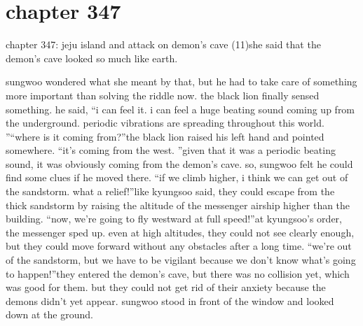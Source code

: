 \section{chapter 347}

chapter 347: jeju island and attack on demon’s cave (11)she said that the demon’s cave looked so much like earth.





sungwoo wondered what she meant by that, but he had to take care of something more important than solving the riddle now.
 the black lion finally sensed something.
he said, “i can feel it.
 i can feel a huge beating sound coming up from the underground.
 periodic vibrations are spreading throughout this world.
”“where is it coming from?”the black lion raised his left hand and pointed somewhere.
“it’s coming from the west.
”given that it was a periodic beating sound, it was obviously coming from the demon’s cave.
so, sungwoo felt he could find some clues if he moved there.
“if we climb higher, i think we can get out of the sandstorm.
 what a relief!”like kyungsoo said, they could escape from the thick sandstorm by raising the altitude of the messenger airship higher than the building.
“now, we’re going to fly westward at full speed!”at kyungsoo’s order, the messenger sped up.
 even at high altitudes, they could not see clearly enough, but they could move forward without any obstacles after a long time.
“we’re out of the sandstorm, but we have to be vigilant because we don’t know what’s going to happen!”they entered the demon’s cave, but there was no collision yet, which was good for them.
 but they could not get rid of their anxiety because the demons didn’t yet appear.
sungwoo stood in front of the window and looked down at the ground.

